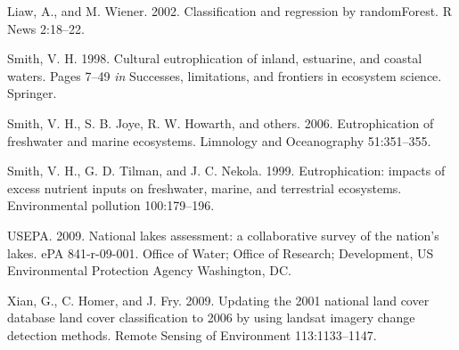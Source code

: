 \documentclass[11pt,]{article}
\begin{document}
Liaw, A., and M. Wiener. 2002. Classification and regression by
randomForest. R News 2:18--22.

Smith, V. H. 1998. Cultural eutrophication of inland, estuarine, and
coastal waters. Pages 7--49 \emph{in} Successes, limitations, and
frontiers in ecosystem science. Springer.

Smith, V. H., S. B. Joye, R. W. Howarth, and others. 2006.
Eutrophication of freshwater and marine ecosystems. Limnology and
Oceanography 51:351--355.

Smith, V. H., G. D. Tilman, and J. C. Nekola. 1999. Eutrophication:
impacts of excess nutrient inputs on freshwater, marine, and terrestrial
ecosystems. Environmental pollution 100:179--196.

USEPA. 2009. National lakes assessment: a collaborative survey of the
nation's lakes. ePA 841-r-09-001. Office of Water; Office of Research;
Development, US Environmental Protection Agency Washington, DC.

Xian, G., C. Homer, and J. Fry. 2009. Updating the 2001 national land
cover database land cover classification to 2006 by using landsat
imagery change detection methods. Remote Sensing of Environment
113:1133--1147.
\end{document}
